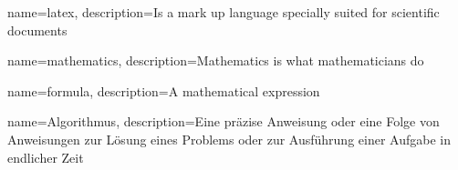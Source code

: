 {
        name=latex,
        description={Is a mark up language specially suited for 
scientific documents}
}

{
        name=mathematics,
        description={Mathematics is what mathematicians do}
}

{
        name=formula,
        description={A mathematical expression}
}

{
        name=Algorithmus,
        description={Eine präzise Anweisung oder eine Folge von Anweisungen zur Lösung eines Problems oder zur Ausführung einer Aufgabe in endlicher Zeit}
}







\printglossaries